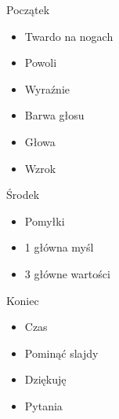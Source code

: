 \documentclass{beamer}
\begin{document}
\begin{frame}{}
	\begin{center}
		\Huge{Początek}
	\end{center}
\end{frame}

\begin{frame}{}
	\begin{Large}
		\begin{itemize}
			\item Twardo na nogach
			\item Powoli
			\item Wyraźnie
			\item Barwa głosu
			\item Głowa
			\item Wzrok
		\end{itemize}
	\end{Large}
\end{frame}

\begin{frame}{}
	\begin{center}
		\Huge{Środek}
	\end{center}
\end{frame}

\begin{frame}{}
	\begin{Large}
		\begin{itemize}
			\item Pomyłki
			\item 1 główna myśl
			\item 3 główne wartości
		\end{itemize}
	\end{Large}
\end{frame}

\begin{frame}{}
	\begin{center}
		\Huge{Koniec}
	\end{center}
\end{frame}

\begin{frame}{}
	\begin{Large}
		\begin{itemize}
			\item Czas
			\item Pominąć slajdy
			\item Dziękuję
			\item Pytania
		\end{itemize}
	\end{Large}
\end{frame}
\end{document}
